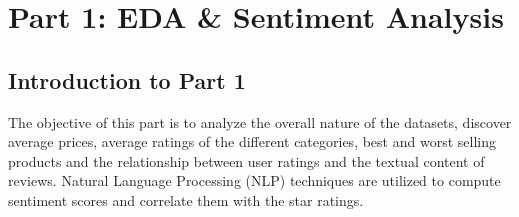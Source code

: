 \documentclass[a4paper, 12pt]{article}
\begin{document}
\section{Part 1: EDA \& Sentiment Analysis}

\subsection{Introduction to Part 1}
The objective of this part is to analyze the overall nature of the datasets, discover average prices, average ratings of the different categories, best and worst selling products and the relationship between user ratings and the textual content of reviews. Natural Language Processing (NLP) techniques are utilized to compute sentiment scores and correlate them with the star ratings.
\end{document}
